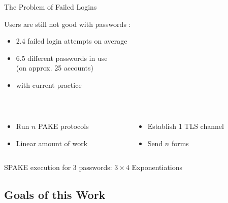 \documentclass[notes]{beamer}
\begin{document}
\begin{frame}{The Problem of Failed Logins}{}

	Users are still not good with passwords \cite{Florencio2007,Gaw2006a}:
	
	\begin{itemize}
		\item 2.4 failed login attempts on average
		\item 6.5 different passwords in use\\ (on approx. 25 accounts)
		\item {} with current practice
	\end{itemize}
	\pause\vspace*{1em}

	\begin{columns}[t]
    \begin{column}{.475\linewidth}
	    	{\centering{}}\\
	    	\begin{itemize}
	    		\setlength{\itemindent}{-1em}
	    		\item Run $n$ PAKE protocols
		    \item Linear amount of work
	    	\end{itemize}
    \end{column}
    \begin{column}{.475\linewidth}
    		{\centering{}}\\
    		\begin{itemize}
	    		\setlength{\itemindent}{-1em}
	    		\item Establish 1 TLS channel
	    		\item Send $n$ forms
    		\end{itemize}
    \end{column}
  \end{columns}
	\vspace*{2em}
	SPAKE execution for $3$ passwords: $3\times4$ Exponentiations%
\end{frame}

\subsection{Goals of this Work}
\end{document}

